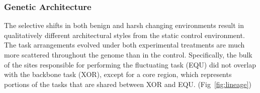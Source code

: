 \documentclass[PhD]{msu-thesis}
\begin{document}
\subsubsection{Genetic Architecture}
The selective shifts in both benign and harsh changing environments result in qualitatively different architectural styles from the static control environment. The task arrangements evolved under both experimental treatments are much more scattered throughout the genome than in the control. Specifically, the bulk of the sites responsible for performing the fluctuating task (EQU) did not overlap with the backbone task (XOR), except for a core region, which represents portions of the tasks that are shared between XOR and EQU. (Fig~\ref{fig:lineage})
\end{document}
